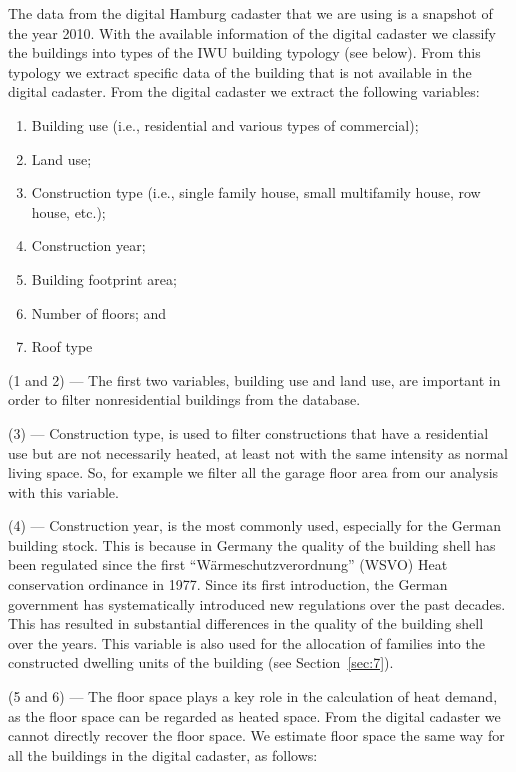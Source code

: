 \documentclass[11pt]{IJM-article}
\begin{document}
The data from the digital Hamburg cadaster that we are using is a snapshot of
the year 2010.  With the available information of the digital cadaster we
classify the buildings into types of the IWU building typology (see below).
From this typology we extract specific data of the building that is not
available in the digital cadaster. From the digital cadaster we extract the
following variables:

\begin{enumerate}
    \item Building use (i.e., residential and various types of commercial);
    \item Land use;
    \item Construction type (i.e., single family house, small multifamily
        house, row house, etc.);
    \item Construction year;
    \item Building footprint area;
    \item Number of floors; and
    \item Roof type
\end{enumerate}

(1 and 2) --- The first two variables, building use and land use, are important
in order to filter nonresidential buildings from the database.

(3) --- Construction type, is used to filter constructions that have a
residential use but are not necessarily heated, at least not with the same
intensity as normal living space. So, for example we filter all the garage
floor area from our analysis with this variable.

(4) --- Construction year, is the most commonly used, especially for the German
building stock.  This is because in Germany the quality of the building shell
has been regulated since the first ``Wärmeschutzverordnung'' (WSVO) Heat
conservation ordinance in 1977. Since its first introduction, the German
government has systematically introduced new regulations over the past decades.
This has resulted in substantial differences in the quality of the building
shell over the years. This variable is also used for the allocation of families
into the constructed dwelling units of the building (see
Section~\ref{sec:7}).

(5 and 6) --- The floor space plays a key role in the calculation of heat demand,
as the floor space can be regarded as heated space. From the digital cadaster
we cannot directly recover the floor space. We estimate floor space the same
way for all the buildings in the digital cadaster, as follows:
\end{document}
